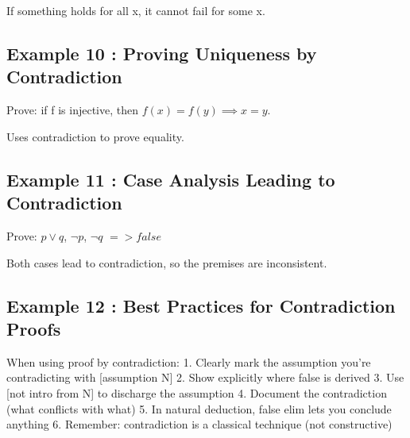 \documentclass[a4paper,10pt,fleqn]{article}
\begin{document}
\noindent If something holds for all x, it cannot fail for some x.

\bigskip

\subsection*{Example 10 : Proving Uniqueness by Contradiction}

\noindent Prove: if f is injective, then $f(x) = f(y) \implies x = y$.

\bigskip

\begin{center}
\end{center}
\bigskip

\noindent Uses contradiction to prove equality.

\bigskip

\subsection*{Example 11 : Case Analysis Leading to Contradiction}

\noindent Prove: $p \lor q$, $\lnot p$, $\lnot q$ $=> false$

\bigskip

\begin{center}
\end{center}
\bigskip

\noindent Both cases lead to contradiction, so the premises are inconsistent.

\bigskip

\subsection*{Example 12 : Best Practices for Contradiction Proofs}

\noindent When using proof by contradiction: 1. Clearly mark the assumption you're contradicting with [assumption N] 2. Show explicitly where false is derived 3. Use [not intro from N] to discharge the assumption 4. Document the contradiction (what conflicts with what) 5. In natural deduction, false elim lets you conclude anything 6. Remember: contradiction is a classical technique (not constructive)

\bigskip
\end{document}
